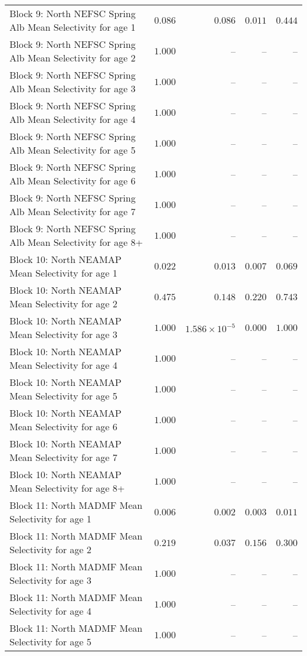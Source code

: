 \documentclass[
]{article}
\begin{document}
\begin{landscape}
\begin{longtable}[t]{lrrrr}
Block 9: North NEFSC Spring Alb Mean Selectivity for age 1 & $0.086$ & $0.086$ & $0.011$ & $0.444$\\
Block 9: North NEFSC Spring Alb Mean Selectivity for age 2 & $1.000$ & -- & -- & --\\
Block 9: North NEFSC Spring Alb Mean Selectivity for age 3 & $1.000$ & -- & -- & --\\
Block 9: North NEFSC Spring Alb Mean Selectivity for age 4 & $1.000$ & -- & -- & --\\
\addlinespace
Block 9: North NEFSC Spring Alb Mean Selectivity for age 5 & $1.000$ & -- & -- & --\\
Block 9: North NEFSC Spring Alb Mean Selectivity for age 6 & $1.000$ & -- & -- & --\\
Block 9: North NEFSC Spring Alb Mean Selectivity for age 7 & $1.000$ & -- & -- & --\\
Block 9: North NEFSC Spring Alb Mean Selectivity for age 8+ & $1.000$ & -- & -- & --\\
Block 10: North NEAMAP Mean Selectivity for age 1 & $0.022$ & $0.013$ & $0.007$ & $0.069$\\
\addlinespace
Block 10: North NEAMAP Mean Selectivity for age 2 & $0.475$ & $0.148$ & $0.220$ & $0.743$\\
Block 10: North NEAMAP Mean Selectivity for age 3 & $1.000$ & $1.586\times 10^{-5}$ & $0.000$ & $1.000$\\
Block 10: North NEAMAP Mean Selectivity for age 4 & $1.000$ & -- & -- & --\\
Block 10: North NEAMAP Mean Selectivity for age 5 & $1.000$ & -- & -- & --\\
Block 10: North NEAMAP Mean Selectivity for age 6 & $1.000$ & -- & -- & --\\
\addlinespace
Block 10: North NEAMAP Mean Selectivity for age 7 & $1.000$ & -- & -- & --\\
Block 10: North NEAMAP Mean Selectivity for age 8+ & $1.000$ & -- & -- & --\\
Block 11: North MADMF Mean Selectivity for age 1 & $0.006$ & $0.002$ & $0.003$ & $0.011$\\
Block 11: North MADMF Mean Selectivity for age 2 & $0.219$ & $0.037$ & $0.156$ & $0.300$\\
Block 11: North MADMF Mean Selectivity for age 3 & $1.000$ & -- & -- & --\\
\addlinespace
Block 11: North MADMF Mean Selectivity for age 4 & $1.000$ & -- & -- & --\\
Block 11: North MADMF Mean Selectivity for age 5 & $1.000$ & -- & -- & --\\

\end{longtable}
\end{landscape}
\end{document}
